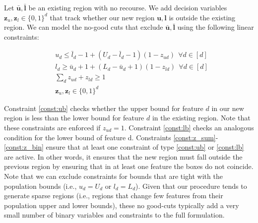Let $\bar{\mathbf{u}}, \bar{\mathbf{l}}$ be an existing region with no recourse. We add decision variables $\mathbf{z}_{u}, \mathbf{z}_{l} \in \{0, 1\}^d$ that track whether our new region $\mathbf{u}, \mathbf{l}$ is outside the existing region. We can model the no-good cuts that exclude $\bar{\mathbf{u}}, \bar{\mathbf{l}}$ using the following linear constraints:

\begin{align}
	 &u_d \leq \bar{l}_d - 1 + (U_d - \bar{l}_d - 1)(1-z_{ud}) ~~ \forall d \in [d] \label{const:ub}\\
	& l_d \geq \bar{u}_d + 1 + (L_d - \bar{u}_d + 1)(1-z_{ld}) ~~ \forall d \in [d] \label{const:lb}\\
    &\sum_d z_{ud} + z_{ld} \geq 1 \label{const:z_sum} \\
    & \mathbf{z}_{u}, \mathbf{z}_{l} \in \{0, 1\}^d \label{const:z_bin} 
\end{align}

Constraint \eqref{const:ub} checks whether the upper bound for feature $d$ in our new region is less than the lower bound for feature $d$ in the existing region. Note that these constraints are enforced if $z_{ud} = 1$. Constraint \eqref{const:lb} checks an analogous condition for the lower bound of feature d. Constraints \eqref{const:z_sum}-\eqref{const:z_bin} ensure that at least one constraint of type \eqref{const:ub} or \eqref{const:lb} are active. In other words, it ensures that the new region must fall outside the previous region by ensuring that in at least one feature the boxes do not coincide. Note that we can exclude constraints for bounds that are tight with the population bounds (i.e., $u_d = U_d$ or $l_d = L_d$). Given that our procedure tends to generate sparse regions (i.e., regions that change few features from their population upper and lower bounds), these no good-cuts typically add a very small number of binary variables and constraints to the full formulation.

